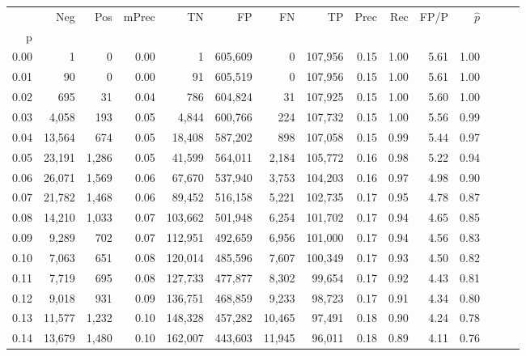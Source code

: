 \begin{tabular}{rrrrrrrrrrrrrrr}
\toprule
{} &     Neg &    Pos & mPrec &       TN &       FP &       FN &       TP &  Prec &   Rec &  FP/P & $\hat{p}$ \\
p    &         &        &       &          &          &          &          &       &       &       &           \\
\midrule
0.00 &       1 &      0 &  0.00 &        1 &  605,609 &        0 &  107,956 &  0.15 &  1.00 &  5.61 &      1.00 \\
0.01 &      90 &      0 &  0.00 &       91 &  605,519 &        0 &  107,956 &  0.15 &  1.00 &  5.61 &      1.00 \\
0.02 &     695 &     31 &  0.04 &      786 &  604,824 &       31 &  107,925 &  0.15 &  1.00 &  5.60 &      1.00 \\
0.03 &   4,058 &    193 &  0.05 &    4,844 &  600,766 &      224 &  107,732 &  0.15 &  1.00 &  5.56 &      0.99 \\
0.04 &  13,564 &    674 &  0.05 &   18,408 &  587,202 &      898 &  107,058 &  0.15 &  0.99 &  5.44 &      0.97 \\
0.05 &  23,191 &  1,286 &  0.05 &   41,599 &  564,011 &    2,184 &  105,772 &  0.16 &  0.98 &  5.22 &      0.94 \\
0.06 &  26,071 &  1,569 &  0.06 &   67,670 &  537,940 &    3,753 &  104,203 &  0.16 &  0.97 &  4.98 &      0.90 \\
0.07 &  21,782 &  1,468 &  0.06 &   89,452 &  516,158 &    5,221 &  102,735 &  0.17 &  0.95 &  4.78 &      0.87 \\
0.08 &  14,210 &  1,033 &  0.07 &  103,662 &  501,948 &    6,254 &  101,702 &  0.17 &  0.94 &  4.65 &      0.85 \\
0.09 &   9,289 &    702 &  0.07 &  112,951 &  492,659 &    6,956 &  101,000 &  0.17 &  0.94 &  4.56 &      0.83 \\
0.10 &   7,063 &    651 &  0.08 &  120,014 &  485,596 &    7,607 &  100,349 &  0.17 &  0.93 &  4.50 &      0.82 \\
0.11 &   7,719 &    695 &  0.08 &  127,733 &  477,877 &    8,302 &   99,654 &  0.17 &  0.92 &  4.43 &      0.81 \\
0.12 &   9,018 &    931 &  0.09 &  136,751 &  468,859 &    9,233 &   98,723 &  0.17 &  0.91 &  4.34 &      0.80 \\
0.13 &  11,577 &  1,232 &  0.10 &  148,328 &  457,282 &   10,465 &   97,491 &  0.18 &  0.90 &  4.24 &      0.78 \\
0.14 &  13,679 &  1,480 &  0.10 &  162,007 &  443,603 &   11,945 &   96,011 &  0.18 &  0.89 &  4.11 &      0.76 \\

\end{tabular}

